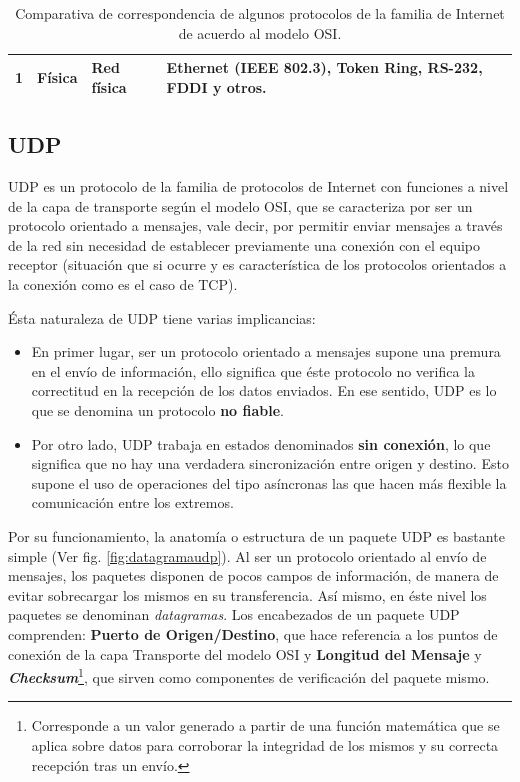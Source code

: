 \begin{table}[h!]
\begin{tabular}{|c|p{4cm}|l|p{5cm}|}
1                                                                                            & Física                                                                                           & Red física                                & Ethernet (IEEE 802.3), Token Ring, RS-232, FDDI y otros.                                              \\ \hline
\end{tabular}
\caption{Comparativa de correspondencia de algunos protocolos de la familia de Internet de acuerdo al modelo OSI.}
\label{tabla:tcpiposi}
\end{table}

\subsection{UDP}
UDP \cite{rfc:768} es un protocolo de la familia de protocolos de Internet con funciones a nivel de la capa de transporte según el modelo OSI, que se caracteriza por ser un protocolo orientado a mensajes, vale decir, por permitir enviar mensajes a través de la red sin necesidad de establecer previamente una conexión con el equipo receptor (situación que si ocurre y es característica de los protocolos orientados a la conexión como es el caso de TCP).

Ésta naturaleza de UDP tiene varias implicancias:
\begin{itemize}
\item En primer lugar, ser un protocolo orientado a mensajes supone una premura en el envío de información, ello significa que éste protocolo no verifica la correctitud en la recepción de los datos enviados. En ese sentido, UDP es lo que se denomina un protocolo \textbf{no fiable}.
\item Por otro lado, UDP trabaja en estados denominados \textbf{sin conexión}, lo que significa que no hay una verdadera sincronización entre origen y destino. Esto supone el uso de operaciones del tipo asíncronas las que hacen más flexible la comunicación entre los extremos.
\end{itemize}

Por su funcionamiento, la anatomía o estructura de un paquete UDP es bastante simple (Ver fig. \ref{fig:datagramaudp}). Al ser un protocolo orientado al envío de mensajes, los paquetes disponen de pocos campos de información, de manera de evitar sobrecargar los mismos en su transferencia. Así mismo, en éste nivel los paquetes se denominan \emph{datagramas}. Los encabezados de un paquete UDP comprenden: \textbf{Puerto de Origen/Destino}, que hace referencia a los puntos de conexión de la capa Transporte del modelo OSI y \textbf{Longitud del Mensaje} y \textbf{\emph{Checksum}}\footnote{Corresponde a un valor generado a partir de una función matemática que se aplica sobre datos para corroborar la integridad de los mismos y su correcta recepción tras un envío.}, que sirven como componentes de verificación del paquete mismo.

